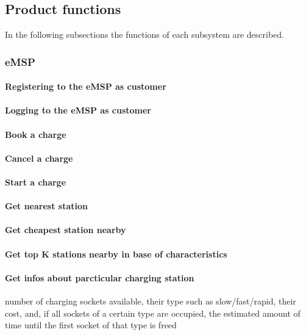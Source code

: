 \subsection{Product functions}
In the following subsections the functions of each subsystem are described.


\subsubsection{\ac{eMSP}}
\paragraph{Registering to the \ac{eMSP} as customer}
\paragraph{Logging to the \ac{eMSP} as customer}
\paragraph{Book a charge}

\paragraph{Cancel a charge}

\paragraph{Start a charge}

\paragraph{Get nearest station}

\paragraph{Get cheapest station nearby}

\paragraph{Get top K stations nearby in base of characteristics}
\paragraph{Get infos about parcticular charging station}
number of charging sockets available, their type such as slow/fast/rapid, their cost, and, if all sockets of a certain type are occupied, the estimated amount of time until the first socket of that type is freed

